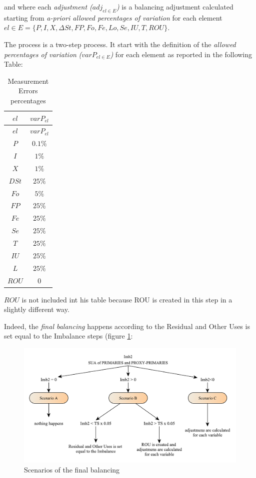 \documentclass[]{article}
\begin{document}
and where each \emph{adjustment (\(adj_{el \in E}\))} is a balancing
adjustment calculated starting from \emph{a-priori allowed percentages
of variation} for each element
\(el \in E = \{P,I,X,\Delta St, FP,Fo,Fe,Lo,Se,IU,T,ROU\}\).

The process is a two-step process. It start with the definition of the
\emph{allowed percentages of variation} \emph{(\(varP_{el \in E}\))} for
each element as reported in the following Table:

\begin{longtable}[]{@{}cc@{}}
\caption{Measurement Errors percentages}\tabularnewline
\toprule
\(el\) & \(varP_{el}\)\tabularnewline
\midrule
\endfirsthead
\toprule
\(el\) & \(varP_{el}\)\tabularnewline
\midrule
\endhead
\(P\) & \(0.1\%\)\tabularnewline
\(I\) & \(1\%\)\tabularnewline
\(X\) & \(1\%\)\tabularnewline
\(DSt\) & \(25\%\)\tabularnewline
\(Fo\) & \(5\%\)\tabularnewline
\(FP\) & \(25\%\)\tabularnewline
\(Fe\) & \(25\%\)\tabularnewline
\(Se\) & \(25\%\)\tabularnewline
\(T\) & \(25\%\)\tabularnewline
\(IU\) & \(25\%\)\tabularnewline
\(L\) & \(25\%\)\tabularnewline
\(ROU\) & \(0\)\tabularnewline
\bottomrule
\end{longtable}

\(ROU\) is not included int his table because ROU is created in this
step in a slightly different way.

Indeed, the \emph{final balancing} happens according to the Residual and
Other Uses is set equal to the Imbalance steps (figure \ref{fig:f10}:

\begin{figure}[H]

{\centering \includegraphics[width=1\linewidth]{images/StandBal/11_ScenariosFinalBal} 

}

\caption{\label{fig:f10}Scenarios of the final balancing}\label{fig:f10}
\end{figure}
\end{document}
